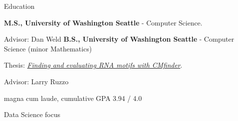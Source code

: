 \begin{rubric}{Education}

	\textbf{M.S., University of Washington Seattle} - Computer Science.
    \par Advisor: Dan Weld
\entry*[2016 -- 2019]%
	\textbf{B.S., University of Washington Seattle} - Computer Science (minor Mathematics)
	\par Thesis: \href{https://cephcyn.github.io/pub/2019-bachelors_thesis-Finding_and_evaluating_RNA_motifs_with_CMfinder.pdf}{\emph{Finding and evaluating RNA motifs with CMfinder}}.
	\par Advisor: Larry Ruzzo
	\par magna cum laude, cumulative GPA 3.94 / 4.0
	\par Data Science focus
\end{rubric}